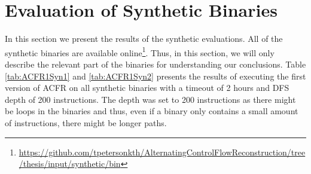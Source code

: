 \documentclass{kththesis}
\begin{document}
\section{Evaluation of Synthetic Binaries}\label{sec:synEval}
In this section we present the results of the synthetic evaluations. All of the synthetic binaries are available online\footnote{\url{https://github.com/tpetersonkth/AlternatingControlFlowReconstruction/tree/thesis/input/synthetic/bin}}. Thus, in this section, we will only describe the relevant part of the binaries for understanding our conclusions. Table \ref{tab:ACFR1Syn1} and \ref{tab:ACFR1Syn2} presents the results of executing the first version of ACFR on all synthetic binaries with a timeout of 2 hours and DFS depth of 200 instructions. The depth was set to 200 instructions as there might be loops in the binaries and thus, even if a binary only contains a small amount of instructions, there might be longer paths.
\end{document}
